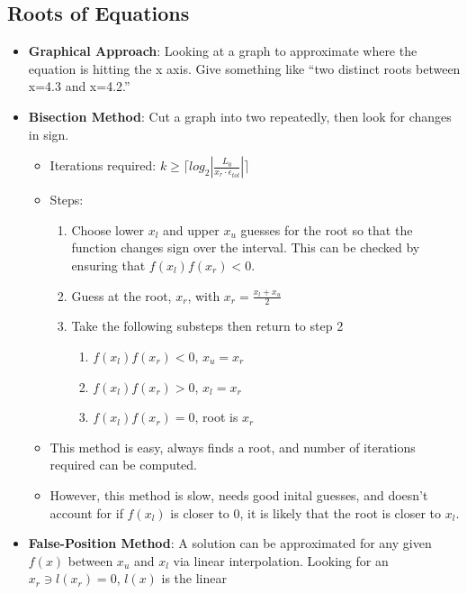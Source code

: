 \documentclass[fontsize=4pt]{scrartcl}
\begin{document}
\begin{multicols}{4}
    \subsection{Roots of Equations}
      \begin{itemize}
       \item \textbf{Graphical Approach}: Looking at a graph to approximate where the equation is hitting the x axis. Give 
          something like ``two distinct roots between x=4.3 and x=4.2.''
       \item \textbf{Bisection Method}: Cut a graph into two repeatedly, then look for changes in sign.
        \begin{itemize}
          \item Iterations required: $k \geq \lceil log_2|\frac{L_0}{x_r \cdot \epsilon_{tol}}|\rceil$
          \item Steps:
          \begin{enumerate}
              \item Choose lower $x_l$ and upper $x_u$ guesses for the root so that the function changes sign over the
              interval. This can be checked by ensuring that $f(x_l)f(x_r) < 0$.
              \item Guess at the root, $x_r$, with $x_r = \frac{x_l + x_u}{2}$
              \item Take the following substeps then return to step 2
              \begin{enumerate}
                \item $f(x_l)f(x_r) < 0$, $x_u = x_r$
                \item $f(x_l)f(x_r) > 0$, $x_l = x_r$
                \item $f(x_l)f(x_r) = 0$, root is $x_r$
              \end{enumerate}
          \end{enumerate}
          \item This method is easy, always finds a root, and number of iterations required can be computed.
          \item However, this method is slow, needs good inital guesses, and doesn't account for if $f(x_l)$
            is closer to 0, it is likely that the root is closer to $x_l$.
        \end{itemize}
        \item \textbf{False-Position Method}: A solution can be approximated for any given $f(x)$ between $x_u$
          and $x_l$ via linear interpolation. Looking for an $x_r \ni l(x_r) = 0$, $l(x)$ is the linear

\end{itemize}
\end{multicols}
\end{document}
